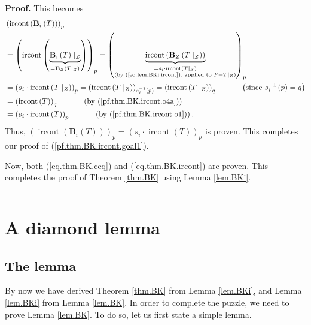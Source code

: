 \documentclass[numbers=enddot,12pt,final,onecolumn,notitlepage]{scrartcl}%
\theoremstyle{definition}
\newenvironment{proof}[1][Proof]{\noindent\textbf{#1.} }{\ \rule{0.5em}{0.5em}}
\newenvironment{verlong}{}{}
\begin{document}
\begin{verlong}
\begin{proof}
This becomes%
\begin{align*}
&  \left(  \operatorname*{ircont}\left(  \mathbf{B}_{i}\left(  T\right)
\right)  \right)  _{p}\\
&  =\left(  \operatorname*{ircont}\left(  \underbrace{\mathbf{B}_{i}\left(
T\right)  \mid_{Z}}_{=\mathbf{B}_{Z}\left(  T\mid_{Z}\right)  }\right)
\right)  _{p}=\left(  \underbrace{\operatorname*{ircont}\left(  \mathbf{B}%
_{Z}\left(  T\mid_{Z}\right)  \right)  }_{\substack{=s_{i}\cdot
\operatorname*{ircont}\left(  T\mid_{Z}\right)  \\\text{(by
(\ref{eq.lem.BKi.ircont}), applied to }P=T\mid_{Z}\text{)}}}\right)  _{p}\\
&  =\left(  s_{i}\cdot\operatorname*{ircont}\left(  T\mid_{Z}\right)  \right)
_{p}=\left(  \operatorname*{ircont}\left(  T\mid_{Z}\right)  \right)
_{s_{i}^{-1}\left(  p\right)  }=\left(  \operatorname*{ircont}\left(
T\mid_{Z}\right)  \right)  _{q}\ \ \ \ \ \ \ \ \ \ \left(  \text{since }%
s_{i}^{-1}\left(  p\right)  =q\right) \\
&  =\left(  \operatorname*{ircont}\left(  T\right)  \right)  _{q}%
\ \ \ \ \ \ \ \ \ \ \left(  \text{by (\ref{pf.thm.BK.ircont.o4a})}\right) \\
&  =\left(  s_{i}\cdot\operatorname*{ircont}\left(  T\right)  \right)
_{p}\ \ \ \ \ \ \ \ \ \ \left(  \text{by (\ref{pf.thm.BK.ircont.o1})}\right)
.
\end{align*}
Thus, $\left(  \operatorname*{ircont}\left(  \mathbf{B}_{i}\left(  T\right)
\right)  \right)  _{p}=\left(  s_{i}\cdot\operatorname*{ircont}\left(
T\right)  \right)  _{p}$ is proven. This completes our proof of
(\ref{pf.thm.BK.ircont.goal1}).

Now, both (\ref{eq.thm.BK.ceq}) and (\ref{eq.thm.BK.ircont}) are proven. This
completes the proof of Theorem \ref{thm.BK} using Lemma \ref{lem.BKi}.
\end{proof}
\end{verlong}

\section{\label{sect.diamond}A diamond lemma}

\subsection{The lemma}

By now we have derived Theorem \ref{thm.BK} from Lemma \ref{lem.BKi}, and
Lemma \ref{lem.BKi} from Lemma \ref{lem.BK}. In order to complete the puzzle,
we need to prove Lemma \ref{lem.BK}. To do so, let us first state a simple lemma.
\end{document}
